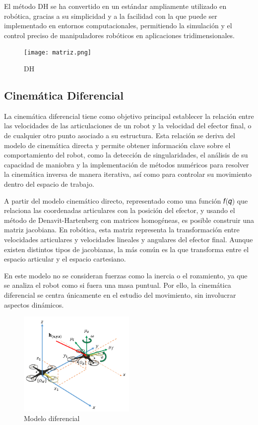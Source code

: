 El método DH se ha convertido en un estándar ampliamente utilizado en robótica, gracias a su simplicidad y a la facilidad con la que puede ser implementado en entornos computacionales, permitiendo la simulación y el control preciso de manipuladores robóticos en aplicaciones tridimensionales.

\begin{figure}[H]
    \centering
    \texttt{[image: matriz.png]}
    \caption{DH}
    \label{fig:matriz}
\end{figure}

\subsection{Cinemática Diferencial}
La cinemática diferencial tiene como objetivo principal establecer la relación entre las velocidades de las articulaciones de un robot y la velocidad del efector final, o de cualquier otro punto asociado a su estructura. Esta relación se deriva del modelo de cinemática directa y permite obtener información clave sobre el comportamiento del robot, como la detección de singularidades, el análisis de su capacidad de maniobra y la implementación de métodos numéricos para resolver la cinemática inversa de manera iterativa, así como para controlar su movimiento dentro del espacio de trabajo.

A partir del modelo cinemático directo, representado como una función 𝑓(𝑞) que relaciona las coordenadas articulares con la posición del efector, y usando el método de Denavit-Hartenberg con matrices homogéneas, es posible construir una matriz jacobiana. En robótica, esta matriz representa la transformación entre velocidades articulares y velocidades lineales y angulares del efector final. Aunque existen distintos tipos de jacobianas, la más común es la que transforma entre el espacio articular y el espacio cartesiano.

En este modelo no se consideran fuerzas como la inercia o el rozamiento, ya que se analiza el robot como si fuera una masa puntual. Por ello, la cinemática diferencial se centra únicamente en el estudio del movimiento, sin involucrar aspectos dinámicos.

\begin{figure}[H]
    \centering
    \includegraphics[width=0.50\textwidth]{img/Modelo-cinematico.png}
    \caption{Modelo diferencial}
    \label{fig:Modelo-cinematico}
\end{figure}

